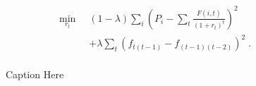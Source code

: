 
\begin{align}
\underset{r_t}{\min} \; \; & (1 - \lambda) \sum_i {\left( P_i - \sum_t \frac{F(i,t)}{{(1+r_t)}^t} \right)}^2  \label{eq:objweighted}\\
& + \lambda \sum_t {\left(f_{t(t-1)} - f_{(t-1)(t-2)}\right)}^2 \nonumber \; .\\
\end{align}

\begin{figure}[tp]
\centering
\caption{Caption Here}
\label{fig:bondsyield}
\end{figure}
